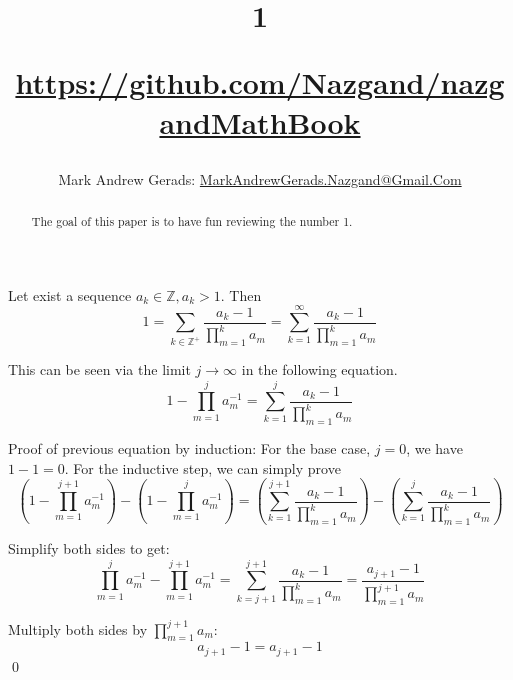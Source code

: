 \documentclass[]{article}
\author{Mark Andrew Gerads: \href{MailTo:MarkAndrewGerads.Nazgand@Gmail.Com}{MarkAndrewGerads.Nazgand@Gmail.Com}}
\title{
	1
	
	\href{https://github.com/Nazgand/nazgandMathBook}{https://github.com/Nazgand/nazgandMathBook}
}
\newcommand{\pqty}[1]{{\left(#1\right)}}
\numberwithin{equation}{section}
\begin{document}
	
	\maketitle
	
	\begin{abstract}
		The goal of this paper is to have fun reviewing the number 1.
	\end{abstract}
	
	Let exist a sequence $a_k\in\mathbb{Z},a_k>1$. Then
	\begin{equation}
		1=\sum_{k\in\mathbb{Z}^+}\frac{a_k-1}{\prod_{m=1}^{k}a_m}
		=\sum_{k=1}^{\infty}\frac{a_k-1}{\prod_{m=1}^{k}a_m}
	\end{equation}


	This can be seen via the limit $j\to\infty$ in the following equation.
	\begin{equation}
	1-\prod_{m=1}^{j}a_m^{-1}=
	\sum_{k=1}^{j}\frac{a_k-1}{\prod_{m=1}^{k}a_m}
	\end{equation}
	
	Proof of previous equation by induction: For the base case, $j=0$, we have $1-1=0$.
	For the inductive step, we can simply prove
	\begin{equation}
		\pqty{1-\prod_{m=1}^{j+1}a_m^{-1}}-\pqty{1-\prod_{m=1}^{j}a_m^{-1}}=
		\pqty{\sum_{k=1}^{j+1}\frac{a_k-1}{\prod_{m=1}^{k}a_m}}-
		\pqty{\sum_{k=1}^{j}\frac{a_k-1}{\prod_{m=1}^{k}a_m}}
	\end{equation}
	
	Simplify both sides to get:
	\begin{equation}
		\prod_{m=1}^{j}a_m^{-1}-\prod_{m=1}^{j+1}a_m^{-1}
		=\sum_{k=j+1}^{j+1}\frac{a_k-1}{\prod_{m=1}^{k}a_m}
		=\frac{a_{j+1}-1}{\prod_{m=1}^{j+1}a_m}
	\end{equation}

	Multiply both sides by $\prod_{m=1}^{j+1}a_m$:
	\begin{equation}
		a_{j+1}-1=a_{j+1}-1
	\end{equation}
	\qed
\end{document}
